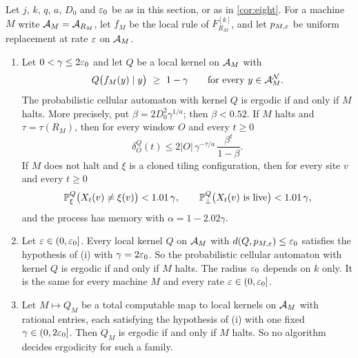 \begin{corollary}\label{cor:robust}
Let $j$, $k$, $q$, $a$, $D_0$ and $\varepsilon_0$ be as in this section, or as in
\cref{cor:eight}. For a machine $M$ write $\mathcal{A}_M=\mathcal{A}_{R_M}$, let $f_M$ be the local
rule of $F^{[k]}_{R_M}$, and let $p_{M,\varepsilon}$ be uniform replacement at rate $\varepsilon$
on $\mathcal{A}_M$.
\begin{enumerate}[label=\textup{(\roman*)}]
\item Let $0<\gamma\le2\varepsilon_0$ and let $Q$ be a local kernel on $\mathcal{A}_M$ with
\[
Q\bigl(f_M(y)\mid y\bigr)\ \ge\ 1-\gamma\qquad\text{for every }y\in\A_M^{\mathcal N}.
\]
The probabilistic cellular automaton with kernel $Q$ is ergodic if and only if $M$
halts. More precisely, put $\beta=2D_0^2\gamma^{1/a}$; then $\beta<0.52$. If $M$
halts and $\tau=\tau(R_M)$, then for every window $O$ and every $t\ge0$
\[
\delta^Q_O(t)\le2|O|\,\gamma^{-\tau/a}\,\frac{\beta^t}{1-\beta}.
\]
If $M$ does not halt and $\xi$ is a cloned tiling configuration, then for every site
$v$ and every $t\ge0$
\[
\mathbb{P}^Q_\xi\bigl(X_t(v)\ne\xi(v)\bigr)<1.01\,\gamma,\qquad
\mathbb{P}^Q_\bot\bigl(X_t(v)\text{ is live}\bigr)<1.01\,\gamma ,
\]
and the process has memory with $\alpha=1-2.02\gamma$.
\item Let $\varepsilon\in(0,\varepsilon_0]$. Every local kernel $Q$ on $\mathcal{A}_M$ with
$d(Q,p_{M,\varepsilon})\le\varepsilon_0$ satisfies the hypothesis of (i) with $\gamma=2\varepsilon_0$. So
the probabilistic cellular automaton with kernel $Q$ is ergodic if and only if $M$
halts. The radius $\varepsilon_0$ depends on $k$ only. It is the same for every machine $M$
and every rate $\varepsilon\in(0,\varepsilon_0]$.
\item Let $M\mapsto Q_M$ be a total computable map to local kernels on $\mathcal{A}_M$ with
rational entries, each satisfying the hypothesis of (i) with one fixed
$\gamma\in(0,2\varepsilon_0]$. Then $Q_M$ is ergodic if and only if $M$ halts. So no
algorithm decides ergodicity for such a family.
\end{enumerate}
\end{corollary}

